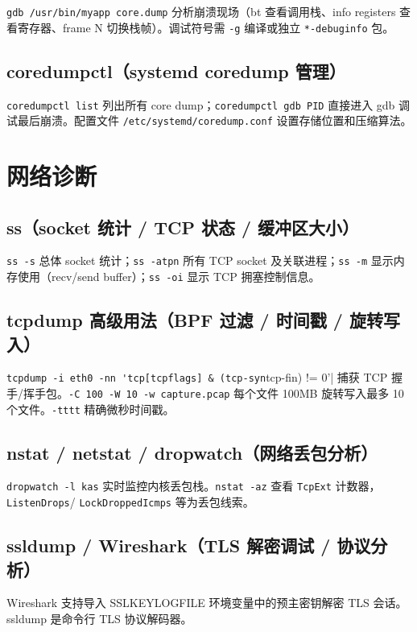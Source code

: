 \documentclass[12pt,UTF8]{ctexbook}
\begin{document}
\verb|gdb /usr/bin/myapp core.dump| 分析崩溃现场（bt 查看调用栈、info registers 查看寄存器、frame N 切换栈帧）。调试符号需 \verb|-g| 编译或独立 \verb|*-debuginfo| 包。

    \subsection{coredumpctl（systemd coredump 管理）}

\verb|coredumpctl list| 列出所有 core dump；\verb|coredumpctl gdb PID| 直接进入 gdb 调试最后崩溃。配置文件 \verb|/etc/systemd/coredump.conf| 设置存储位置和压缩算法。

  \section{网络诊断}
    \subsection{ss（socket 统计 / TCP 状态 / 缓冲区大小）}

\verb|ss -s| 总体 socket 统计；\verb|ss -atpn| 所有 TCP socket 及关联进程；\verb|ss -m| 显示内存使用（recv/send buffer）；\verb|ss -oi| 显示 TCP 拥塞控制信息。

    \subsection{tcpdump 高级用法（BPF 过滤 / 时间戳 / 旋转写入）}

\verb|tcpdump -i eth0 -nn 'tcp[tcpflags] & (tcp-syn|tcp-fin) != 0'| 捕获 TCP 握手/挥手包。\verb|-C 100 -W 10 -w capture.pcap| 每个文件 100MB 旋转写入最多 10 个文件。\verb|-tttt| 精确微秒时间戳。

    \subsection{nstat / netstat / dropwatch（网络丢包分析）}

\verb|dropwatch -l kas| 实时监控内核丢包栈。\verb|nstat -az| 查看 \verb|TcpExt| 计数器，\verb|ListenDrops|/ \verb|LockDroppedIcmps| 等为丢包线索。

    \subsection{ssldump / Wireshark（TLS 解密调试 / 协议分析）}

Wireshark 支持导入 SSLKEYLOGFILE 环境变量中的预主密钥解密 TLS 会话。ssldump 是命令行 TLS 协议解码器。
\end{document}
